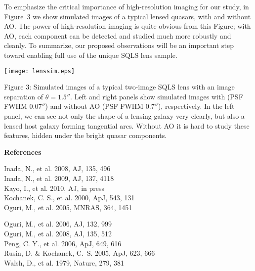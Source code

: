 \documentclass[a4paper,11pt]{article}
\begin{document}
To emphasize the critical importance of high-resolution imaging for
our study, in Figure~3 we show simulated images of a typical lensed
quasars, with and without AO. The power of high-resolution imaging is quite obvious
from this Figure; with AO, each component can be detected and studied
much more robustly and cleanly. To summarize, our proposed
observations will be an important step toward enabling full use of the
unique SQLS lens sample.  

\medskip

\begin{minipage}{0.55\textwidth}
\texttt{[image: lenssim.eps]}
\end{minipage}
\begin{minipage}{0.4\textwidth}
  Figure 3: Simulated images of a typical two-image SQLS lens with an
  image separation of $\theta=1.5''$. Left and right panels show
  simulated images with (PSF FWHM $0.07''$) and
  without AO (PSF FWHM $0.7''$), respectively. In the left
  panel, we can see not only the shape of a lensing galaxy very
  clearly, but also a lensed host galaxy forming tangential
  arcs. Without AO it is hard to study these features, hidden under the bright quasar components. 
\end{minipage}

\medskip

{\bf References}\medskip \\ \hspace*{3mm}
\begin{minipage}{0.48\textwidth}
{\small
Inada, N., et al. 2008, AJ, 135, 496\vspace{-1mm} \\
Inada, N., et al. 2009, AJ, 137, 4118\vspace{-1mm} \\
Kayo, I., et al. 2010, AJ, in press\vspace{-1mm} \\
Kochanek, C. S., et al. 2000, ApJ, 543, 131\vspace{-1mm} \\
Oguri, M., et al. 2005, MNRAS, 364, 1451\vspace{-1mm} \\
}
\end{minipage}
\begin{minipage}{0.45\textwidth}
{\small
Oguri, M., et al. 2006, AJ, 132, 999\vspace{-1mm} \\
Oguri, M., et al. 2008, AJ, 135, 512\vspace{-1mm} \\
Peng, C. Y., et al. 2006, ApJ, 649, 616\vspace{-1mm} \\
Rusin, D. \& Kochanek, C.~S. 2005, ApJ, 623, 666\vspace{-1mm} \\
Walsh, D., et al. 1979, Nature, 279, 381\vspace{-1mm} \\
}
\end{minipage}
\end{document}
